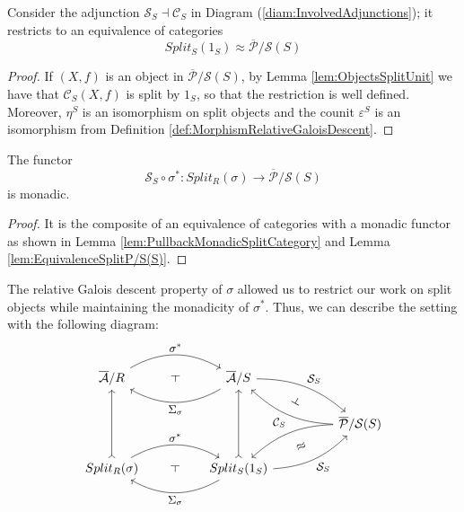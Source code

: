 \begin{lemma}
\label{lem:EquivalenceSplitP/S(S)}
    Consider the adjunction $\mathcal{S}_S\dashv\mathcal{C}_S$ in Diagram (\ref{diam:InvolvedAdjunctions}); it restricts to an equivalence of categories
    \[ Split_S(1_S) \approx \overline{\mathcal{P}}/\mathcal{S}(S) \]
    \begin{proof}
        If $(X,f)$ is an object in $\overline{\mathcal{P}}/\mathcal{S}(S)$, by Lemma \ref{lem:ObjectsSplitUnit} we have that $\mathcal{C}_S(X,f)$ is split by $1_S$, so that the restriction is well defined. Moreover, $\eta^S$ is an isomorphism on split objects and the counit $\varepsilon^S$ is an isomorphism from Definition \ref{def:MorphismRelativeGaloisDescent}.
    \end{proof}
\end{lemma}
\begin{corollary}
\label{cor:CompositionMonadic}
    The functor
    \[ \mathcal{S}_S\circ\sigma^* : Split_R(\sigma)\longrightarrow \overline{\mathcal{P}}/\mathcal{S}(S) \]
    is monadic.
    \begin{proof}
        It is the composite of an equivalence of categories with a monadic functor as shown in Lemma \ref{lem:PullbackMonadicSplitCategory} and Lemma \ref{lem:EquivalenceSplitP/S(S)}.
    \end{proof}
\end{corollary}

The relative Galois descent property of $\sigma$ allowed us to restrict our work on split objects while maintaining the monadicity of $\sigma^*$. Thus, we can describe the setting with the following diagram:
\begin{equation}
\label{diag:InvolvedFunctors}
    \begin{tikzcd}[every label/.append style = {font = \small}]
        \overline{\mathcal{A}}/R \arrow[rr, "\sigma^*", bend left, ""{name=pull}] & & \overline{\mathcal{A}}/S \arrow[ll, "\Sigma_\sigma", bend left, ""{name=comp}] \arrow[rrd, "\mathcal{S}_S", bend left=20, ""{name=Ss}] \\ & & & & \overline{\mathcal{P}}/\mathcal{S}(S) \arrow[llu, "\mathcal{C}_S", bend left=20, ""{name=Cs}] \arrow[dll, bend right=20, ""{name=Csequi}] \\ Split_R(\sigma) \arrow[uu, tail] \arrow[rr, "\sigma^*", bend left, ""{name=pullres}] & & Split_S(1_S) \arrow[uu, tail] \arrow[urr, bend right=20, "\mathcal{S}_S"', ""{name=Ssequi}] \arrow[ll, "\Sigma_\sigma", bend left, ""{name=compres}] \arrow[phantom, from=pull, to=comp, "\dashv" rotate=90] \arrow[phantom, from=pullres, to=compres, "\dashv" rotate=90] \arrow[phantom, from=Ss, to=Cs, "\dashv" rotate=-120] \arrow[phantom, from=Ssequi, to=Csequi, "\approx" rotate=30]
    \end{tikzcd}
\end{equation}

